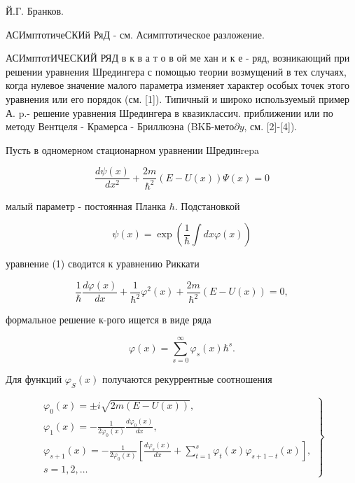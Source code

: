 \documentclass[10pt]{article}
\begin{document}
Й.Г. Бранков.



АСИмптотичеСКИй РяД - см. Асимптотическое разложение.



АСИмптотИЧЕСКИЙ РЯД в к в а т о в ой ме хан и к е - ряд, возникающий при решении уравнения Шредингера с помощью теории возмущений в тех случаях, когда нулевое значение малого параметра изменяет характер особых точек этого уравнения или его порядок (см. [1]). Типичный и широко используемый пример А. p.- решение уравнения Шредингера в квазиклассич. приближении или по методу Вентцеля - Крамерса - Бриллюэна (BKБ-мето$\partial y$, см. [2]-[4]).



Пусть в одномерном стационарном уравнении Шрединrepa



\[

\frac{d \psi(x)}{d x^{2}}+\frac{2 m}{\hbar^{2}}(E-U(x)) \Psi(x)=0

\]



малый параметр - постоянная Планка $\hbar$. Подстановкой



\[

\psi(x)=\exp \left(\frac{1}{\hbar} \int d x \varphi(x)\right)

\]



уравнение (1) сводится к уравнению Риккати



\[

\frac{1}{\hbar} \frac{d \varphi(x)}{d x}+\frac{1}{\hbar^{2}} \varphi^{2}(x)+\frac{2 m}{\hbar^{2}}(E-U(x))=0,

\]



формальное решение к-рого ищется в виде ряда



\[

\varphi(x)=\sum_{s=0}^{\infty} \varphi_{s}(x) \hbar^{s} .

\]



Для функций $\varphi_{S}(x)$ получаются рекуррентные соотношения



\[

\left.\begin{array}{l}

\varphi_{0}(x)= \pm i \sqrt{2 m(E-U(x))}, \\

\varphi_{1}(x)=-\frac{1}{2 \varphi_{0}(x)} \frac{d \varphi_{0}(x)}{d x}, \\

\varphi_{s+1}(x)=-\frac{1}{2 \varphi_{0}(x)}\left[\frac{d \varphi_{s}(x)}{d x}+\sum_{t=1}^{s} \varphi_{t}(x) \varphi_{s+1-t}(x)\right], \\

s=1,2, \ldots

\end{array}\right\}

\]
\end{document}
